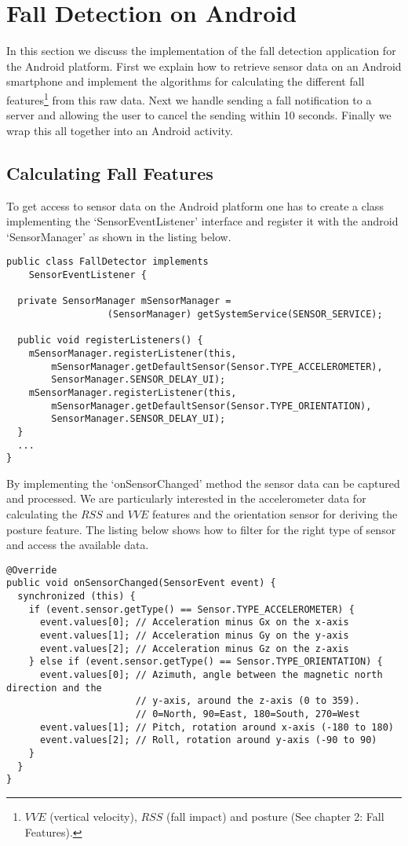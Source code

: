 \section{Fall Detection on Android}
In this section we discuss the implementation of the fall detection application for the Android platform. First we explain how to retrieve sensor data on an Android smartphone and implement the algorithms for calculating the different fall features\footnote{$VVE$ (vertical velocity), $RSS$ (fall impact) and posture (See chapter 2: Fall Features).} from this raw data. Next we handle sending a fall notification to a server and allowing the user to cancel the sending within 10 seconds. Finally we wrap this all together into an Android activity.

\subsection{Calculating Fall Features}
To get access to sensor data on the Android platform one has to create a class implementing the `SensorEventListener' interface and register it with the android `SensorManager' as shown in the listing below.
\begin{lstlisting}
public class FallDetector implements
    SensorEventListener {
    
  private SensorManager mSensorManager = 
                  (SensorManager) getSystemService(SENSOR_SERVICE);
    
  public void registerListeners() {
    mSensorManager.registerListener(this,
        mSensorManager.getDefaultSensor(Sensor.TYPE_ACCELEROMETER),
        SensorManager.SENSOR_DELAY_UI);
    mSensorManager.registerListener(this,
        mSensorManager.getDefaultSensor(Sensor.TYPE_ORIENTATION),
        SensorManager.SENSOR_DELAY_UI);
  }  
  ...  
}
\end{lstlisting}
By implementing the `onSensorChanged' method the sensor data can be captured and processed. We are particularly interested in the accelerometer data for calculating the $RSS$ and $VVE$ features and the orientation sensor for deriving the posture feature. The listing below shows how to filter for the right type of sensor and access the available data.
\begin{lstlisting}
@Override
public void onSensorChanged(SensorEvent event) {
  synchronized (this) {
    if (event.sensor.getType() == Sensor.TYPE_ACCELEROMETER) {
      event.values[0]; // Acceleration minus Gx on the x-axis
      event.values[1]; // Acceleration minus Gy on the y-axis
      event.values[2]; // Acceleration minus Gz on the z-axis
    } else if (event.sensor.getType() == Sensor.TYPE_ORIENTATION) {      
      event.values[0]; // Azimuth, angle between the magnetic north direction and the
                       // y-axis, around the z-axis (0 to 359). 
                       // 0=North, 90=East, 180=South, 270=West
      event.values[1]; // Pitch, rotation around x-axis (-180 to 180)
      event.values[2]; // Roll, rotation around y-axis (-90 to 90)
    }
  }
}
\end{lstlisting}

